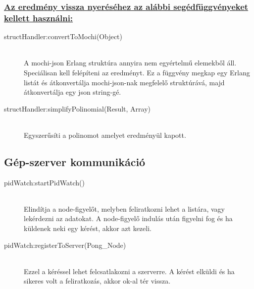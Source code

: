 	\subsubsection{\underline{Az eredmény vissza nyeréséhez az alábbi segédfüggvényeket kellett használni:}}
	\begin{description}
	
		\item[structHandler:convertToMochi(Object)] \hfill \\ 
		A mochi-json Erlang struktúra annyira nem egyértelmű elemekből áll. Speciálisan kell felépíteni az eredményt. Ez a függvény megkap egy Erlang listát és átkonvertálja mochi-json-nak megfelelő struktúrává, majd átkonvertálja egy json string-gé.

		\item[structHandler:simplifyPolinomial(Result, Array) ] \hfill \\ 
		Egyszerűsíti a polinomot amelyet eredményül kapott.
	
	\end{description}
\subsection{Gép-szerver kommunikáció}
	\begin{description}
	\item[pidWatch:startPidWatch()]
	\hfill \\ Elindítja a node-figyelőt, melyben feliratkozni lehet a listára, vagy lekérdezni az adatokat. A node-figyelő indulás után figyelni fog és ha küldenek neki egy kérést, akkor azt kezeli. 
	\item[pidWatch:registerToServer(Pong\_Node)]
	\hfill \\ Ezzel a kéréssel lehet felcsatlakozni a szerverre. A kérést elküldi és ha sikeres volt a feliratkozás, akkor ok-al tér vissza.
	\end{description}

